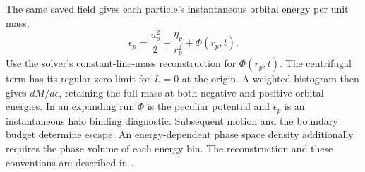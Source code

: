 The same saved field gives each particle's instantaneous orbital energy per
unit mass,
\[
 \epsilon_p=\frac{u_p^2}{2}+\frac{\eta_p}{r_p^2}
                  +\Phi(r_p,t).                    \tag{WPIC-D13}
\]
Use the solver's constant-line-mass reconstruction for \(\Phi(r_p,t)\).
The centrifugal term has its regular zero limit for \(L=0\) at the origin.
A weighted histogram then gives \(dM/d\epsilon\), retaining the full mass
at both negative and positive orbital energies. In an expanding run
\(\Phi\) is the peculiar potential and \(\epsilon_p\) is an instantaneous
halo binding diagnostic. Subsequent motion and the boundary budget determine
escape. An energy-dependent phase space density additionally requires the
phase volume of each energy bin. The reconstruction and these conventions
are described in .
